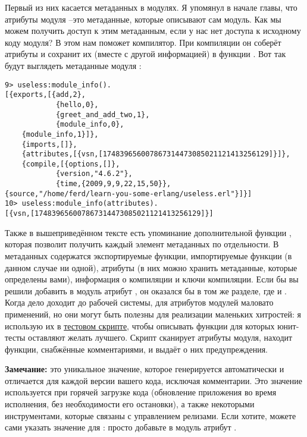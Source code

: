 Первый из них касается метаданных в модулях.
Я упомянул в начале главы, что атрибуты модуля \---это метаданные, которые описывают сам модуль.
Как мы можем получить доступ к этим метаданным, если у нас нет доступа к исходному коду модуля?
В этом нам поможет компилятор.
При компиляции он соберёт атрибуты и сохранит их (вместе с другой информацией) в функции .
Вот так будут выглядеть метаданные модуля :
\begin{lstlisting}[style=erlang]
9> useless:module_info().
[{exports,[{add,2},
            {hello,0},
            {greet_and_add_two,1},
            {module_info,0},
    {module_info,1}]},
    {imports,[]},
    {attributes,[{vsn,[174839656007867314473085021121413256129]}]},
    {compile,[{options,[]},
            {version,"4.6.2"},
            {time,{2009,9,9,22,15,50}},
{source,"/home/ferd/learn-you-some-erlang/useless.erl"}]}]
10> useless:module_info(attributes).
[{vsn,[174839656007867314473085021121413256129]}]
\end{lstlisting}

Также в вышеприведённом тексте есть упоминание дополнительной функции , которая позволит получить каждый элемент метаданных по отдельности.
В метаданных содержатся экспортируемые функции, импортируемые функции (в данном случае ни одной), атрибуты (в них можно хранить метаданные, которые определены вами), информация о компиляции и ключи компиляции.
Если бы вы решили добавить в модуль атрибут , он оказался бы в том же разделе, где и .
Когда дело доходит до рабочей системы, для атрибутов модулей маловато применений, но они могут быть полезны для реализации маленьких хитростей: я использую их в \href{http://learnyousomeerlang.com/static/erlang/tester.erl}{тестовом скрипте}, чтобы описывать функции для которых юнит\--тесты оставляют желать лучшего.
Скрипт сканирует атрибуты модуля, находит функции, снабжённые комментариями, и выдаёт о них предупреждения.\\ 
\colorbox{lgray}
{
    \begin{minipage}{1\linewidth}
        \textbf{Замечание:}  это уникальное значение, которое генерируется автоматически и отличается для каждой версии вашего кода, исключая комментарии.
        Это значение используется при горячей загрузке кода (обновление приложения во время исполнения, без необходимости его остановки), а также некоторыми инструментами, которые связаны с управлением релизами.
        Если хотите, можете сами указать значение для : просто добавьте в модуль атрибут .
    \end{minipage}
}

